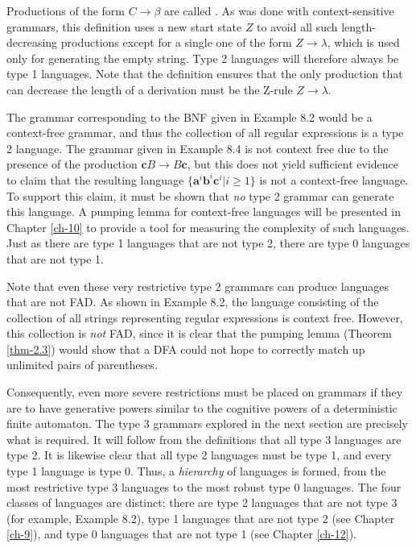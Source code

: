 Productions of the form $C\rightarrow\beta$ are called \emph{}.
As was done with context-sensitive grammars, this definition uses a new start
state $Z$ to avoid all such length-decreasing productions except for a single
one of the form $Z\rightarrow\lambda$, which is used only for generating the
empty string. Type 2 languages will therefore always be type 1 languages. Note
that the definition ensures that the only production that can decrease the
length of a derivation must be the Z-rule $Z\rightarrow\lambda$.

The grammar corresponding to the BNF given in Example 8.2 would be a
context-free grammar, and thus the collection of all regular expressions is a
type 2 language. The grammar given in Example 8.4 is not context free due to the
presence of the production $\pmb{c}B\rightarrow B\pmb{c}$, but this does not
yield sufficient evidence to claim that the resulting language $\{\pmb{a}^i
\pmb{b}^i\pmb{c}^i|i\geq 1\}$ is not a context-free language. To support this
claim, it must be shown that \emph{no} type 2 grammar can generate this language.
A pumping lemma for context-free languages will be presented in Chapter \ref{ch-10} to
provide a tool for measuring the complexity of such languages. Just as there
are type 1 languages that are not type 2, there are type 0 languages that are
not type 1.

Note that even these very restrictive type 2 grammars can produce languages
that are not FAD. As shown in Example 8.2, the language consisting of the
collection of all strings representing regular expressions is context free.
However, this collection is \emph{not} FAD, since it is clear that the pumping
lemma (Theorem \ref{thm-2.3}) would show that a DFA could not hope to correctly match up
unlimited pairs of parentheses.

Consequently, even more severe restrictions must be placed on grammars if they
are to have generative powers similar to the cognitive powers of a deterministic
finite automaton. The type 3 grammars explored in the next section are precisely
what is required. It will follow from the definitions that all type 3 languages
are type 2. It is likewise clear that all type 2 languages must be type 1, and
every type 1 language is type 0. Thus, a \emph{hierarchy} of languages is formed,
from the most restrictive type 3 languages to the most robust type 0 languages.
The four classes of languages are distinct; there are type 2 languages that are
not type 3 (for example, Example 8.2), type 1 languages that are not type 2 (see
Chapter \ref{ch-9}), and type 0 languages that are not type 1 (see Chapter \ref{ch-12}).

